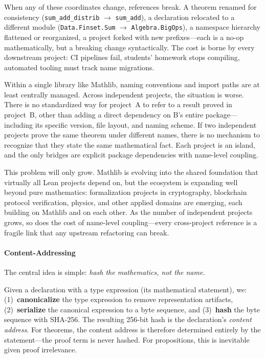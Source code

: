 When any of these coordinates change, references break.  A theorem
renamed for consistency (\texttt{sum\_add\_distrib} $\to$
\texttt{sum\_add}), a declaration relocated to a different module
(\texttt{Data.Finset.Sum} $\to$ \texttt{Algebra.BigOps}), a namespace
hierarchy flattened or reorganized, a project forked with new
prefixes---each is a no-op mathematically, but a breaking change
syntactically.  The cost is borne by every downstream project: CI
pipelines fail, students' homework stops compiling, automated tooling
must track name migrations.

Within a single library like Mathlib, naming conventions and import
paths are at least centrally managed.  Across independent projects, the
situation is worse.  There is no standardized way for project~A to
refer to a result proved in project~B, other than adding a direct
dependency on B's entire package---including its specific version, file
layout, and naming scheme.  If two independent projects prove the same
theorem under different names, there is no mechanism to recognize that
they state the same mathematical fact.  Each project is an island, and
the only bridges are explicit package dependencies with name-level
coupling.

This problem will only grow.  Mathlib is evolving into the shared
foundation that virtually all Lean projects depend on, but the
ecosystem is expanding well beyond pure mathematics: formalization
projects in cryptography, blockchain protocol verification, physics,
and other applied domains are emerging, each building on Mathlib and
on each other.  As the number of independent projects grows, so does
the cost of name-level coupling---every cross-project reference is a
fragile link that any upstream refactoring can break.


\paragraph{Content-Addressing}

The central idea is simple: \emph{hash the mathematics, not the name.}

Given a declaration with a type expression (its mathematical statement),
we: (1)~\textbf{canonicalize} the type expression to remove
representation artifacts, (2)~\textbf{serialize} the canonical
expression to a byte sequence, and (3)~\textbf{hash} the byte sequence
with SHA-256.  The resulting 256-bit hash is the declaration's
\emph{content address}.
For theorems, the content address is therefore determined entirely by
the statement---the proof term is never hashed.
For propositions, this is inevitable given proof irrelevance.

